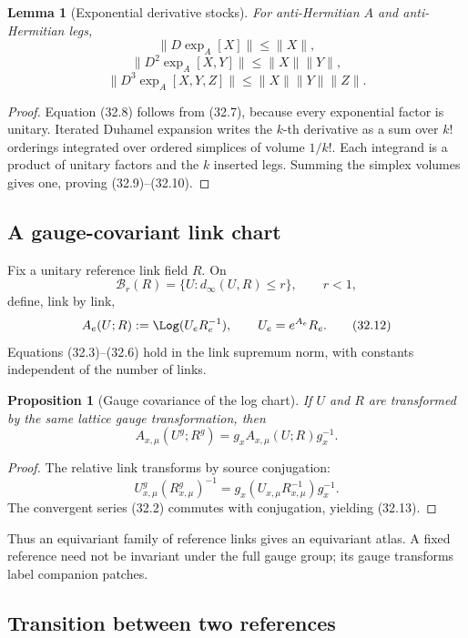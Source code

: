 \documentclass[11pt]{article}
\newtheorem{lemma}[theorem]{Lemma}
\newtheorem{proposition}[theorem]{Proposition}
\begin{document}
\begin{lemma}[Exponential derivative stocks]
\label{lem:v11v32-exp-stocks}
For anti-Hermitian \(A\) and anti-Hermitian legs,
\[
 \|D\exp_A[X]\|\leq\|X\|,
 \tag{32.8}
\]
\[
 \|D^2\exp_A[X,Y]\|\leq\|X\|\|Y\|,
 \tag{32.9}
\]
\[
 \|D^3\exp_A[X,Y,Z]\|
 \leq\|X\|\|Y\|\|Z\|.
 \tag{32.10}
\]
\end{lemma}

\begin{proof}
Equation (32.8) follows from (32.7), because every exponential factor
is unitary.  Iterated Duhamel expansion writes the \(k\)-th derivative
as a sum over \(k!\) orderings integrated over ordered simplices of
volume \(1/k!\).  Each integrand is a product of unitary factors and the
\(k\) inserted legs.  Summing the simplex volumes gives one, proving
(32.9)--(32.10).
\end{proof}

\subsection{A gauge-covariant link chart}

Fix a unitary reference link field \(R\).  On
\[
 \mathcal B_r(R)
 =
 \{U:d_\infty(U,R)\leq r\},\qquad r<1,
 \tag{32.11}
\]
define, link by link,
\[
 A_e(U;R):=\Log(U_eR_e^{-1}),
 \qquad
 U_e=e^{A_e}R_e.
 \tag{32.12}
\]
Equations (32.3)--(32.6) hold in the link supremum norm, with constants
independent of the number of links.

\begin{proposition}[Gauge covariance of the log chart]
\label{prop:v11v32-gauge-covariance}
If \(U\) and \(R\) are transformed by the same lattice gauge
transformation, then
\[
 A_{x,\mu}(U^g;R^g)
 =
 g_xA_{x,\mu}(U;R)g_x^{-1}.
 \tag{32.13}
\]
\end{proposition}

\begin{proof}
The relative link transforms by source conjugation:
\[
 U^g_{x,\mu}(R^g_{x,\mu})^{-1}
 =
 g_x(U_{x,\mu}R_{x,\mu}^{-1})g_x^{-1}.
\]
The convergent series (32.2) commutes with conjugation, yielding
(32.13).
\end{proof}

Thus an equivariant family of reference links gives an equivariant atlas.
A fixed reference need not be invariant under the full gauge group; its
gauge transforms label companion patches.

\subsection{Transition between two references}
\end{document}
